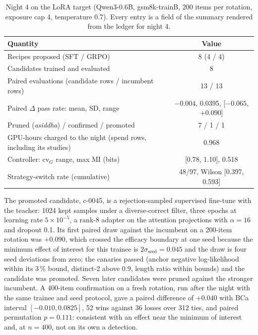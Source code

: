 \begin{table}[t]
\centering
\caption{Night 4 on the LoRA target (Qwen3-0.6B, gsm8k-trainB, 200 items per rotation, exposure cap 4, temperature 0.7). Every entry is a field of the summary rendered from the ledger for night 4.}
\label{tab:p1-night4}
\begin{tabular}{lc}
\toprule
\textbf{Quantity} & \textbf{Value} \\
\midrule
Recipes proposed (SFT / GRPO) & 8 (4 / 4) \\
Candidates trained and evaluated & 8 \\
Paired evaluations (candidate rows / incumbent rows) & 13 / 13 \\
Paired $\Delta$ pass rate: mean, SD, range & $-0.004$, 0.0395, [$-0.065$, $+0.090$] \\
Pruned (\emph{asiddha}) / confirmed / promoted & 7 / 1 / 1 \\
GPU-hours charged to the night (spend rows, including its studies) & 0.968 \\
Controller: $\mathrm{cv}_G$ range, max MI (bits) & [0.78, 1.10], 0.518 \\
Strategy-switch rate (cumulative) & 48/97, Wilson [0.397, 0.593] \\
\bottomrule
\end{tabular}
\end{table}

The promoted candidate, c-0045, is a rejection-sampled supervised fine-tune with the teacher: 1024 kept samples under a diverse-correct filter, three epochs at learning rate $5\times10^{-5}$, a rank-8 adapter on the attention projections with $\alpha=16$ and dropout 0.1. Its first paired draw against the incumbent on a 200-item rotation was $+0.090$, which crossed the efficacy boundary at one seed because the minimum effect of interest for this trainee is $2\sigma_{\mathrm{seed}}=0.045$ and the draw is four seed deviations from zero; the canaries passed (anchor negative log-likelihood within its 3\,\% bound, distinct-2 above 0.9, length ratio within bounds) and the candidate was promoted. Seven later candidates were pruned against the stronger incumbent. A 400-item confirmation on a fresh rotation, run after the night with the same trainee and seed protocol, gave a paired difference of $+0.040$ with BCa interval $[-0.010, 0.0825]$, 52 wins against 36 losses over 312 ties, and paired permutation $p=0.111$: consistent with an effect near the minimum of interest and, at $n=400$, not on its own a detection.

